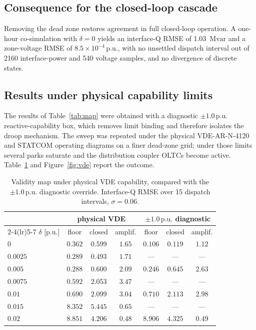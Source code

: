 \documentclass[11pt,a4paper]{article}
\newcommand{\pu}{\ensuremath{\mathrm{p.u.}}}
\newcommand{\Mvar}{\ensuremath{\mathrm{Mvar}}}
\begin{document}
\subsection{Consequence for the closed-loop cascade}

Removing the dead zone restores agreement in full closed-loop operation. A
one-hour co-simulation with $\delta = 0$ yields an interface-Q RMSE of
\SI{1.03}{\Mvar} and a zone-voltage RMSE of $8.5\times10^{-4}\,\pu$, with no
unsettled dispatch interval out of 2160 interface-power and 540 voltage
samples, and no divergence of discrete states.

\subsection{Results under physical capability limits}
\label{sec:vde}

The results of Table~\ref{tab:map} were obtained with a diagnostic
$\pm1.0\,\pu$ reactive-capability box, which removes limit binding and
therefore isolates the droop mechanism. The sweep was repeated under the
physical VDE-AR-N-4120 and STATCOM operating diagrams on a finer dead-zone
grid; under those limits several parks saturate and the distribution coupler
OLTCs become active. Table~\ref{tab:vde} and Figure~\ref{fig:vde} report the
outcome.

\begin{table}[htbp]
  \centering
  \caption{Validity map under physical VDE capability, compared with the
  $\pm1.0\,\pu$ diagnostic override. Interface-Q RMSE over 15 dispatch
  intervals, $\sigma = 0.06$.}
  \label{tab:vde}
  \begin{tabular}{lccc@{\hskip 8mm}ccc}
    \toprule
    & \multicolumn{3}{c}{physical VDE}
    & \multicolumn{3}{c}{$\pm1.0\,\pu$ diagnostic}\\
    \cmidrule(lr){2-4}\cmidrule(lr){5-7}
    $\delta$ [\pu] & floor & closed & amplif.
                   & floor & closed & amplif.\\
    \midrule
    $0$      & $0.362$ & $0.599$ & $1.65$ & $0.106$ & $0.119$ & $1.12$\\
    $0.0025$ & $0.289$ & $0.493$ & $1.71$ & ---     & ---     & ---   \\
    $0.005$  & $0.288$ & $0.600$ & $2.09$ & $0.246$ & $0.645$ & $2.63$\\
    $0.0075$ & $0.592$ & $2.053$ & $3.47$ & ---     & ---     & ---   \\
    $0.01$   & $0.690$ & $2.099$ & $3.04$ & $0.710$ & $2.113$ & $2.98$\\
    $0.015$  & $8.352$ & $5.445$ & $0.65$ & ---     & ---     & ---   \\
    $0.02$   & $8.851$ & $4.206$ & $0.48$ & $8.906$ & $4.325$ & $0.49$\\
    \bottomrule
  \end{tabular}
\end{table}
\end{document}
